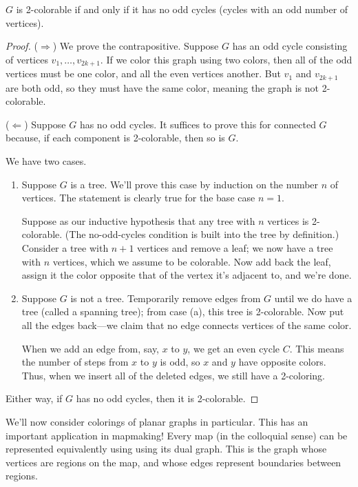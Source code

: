 \documentclass[../m055main.tex]{subfiles}
\begin{document}
\begin{theorem}
    $G$ is 2-colorable if and only if it has no odd cycles (cycles with an odd number of vertices).
\end{theorem}

\begin{proof}
    ($\Rightarrow$) We prove the contrapositive.
    Suppose $G$ has an odd cycle consisting of vertices $v_1, \ldots, v_{2k+1}$.
    If we color this graph using two colors, then all of the odd vertices must be one color, and all the even vertices another.
    But $v_1$ and $v_{2k+1}$ are both odd, so they must have the same color, meaning the graph is not 2-colorable.
    \smallskip

    ($\Leftarrow$) Suppose $G$ has no odd cycles.
    It suffices to prove this for connected $G$ because, if each component is 2-colorable, then so is $G$.

    We have two cases.
    \begin{enumerate}[label=(\alph*)]
        \item Suppose $G$ is a tree.
        We'll prove this case by induction on the number $n$ of vertices.
        The statement is clearly true for the base case $n=1$.

        Suppose as our inductive hypothesis that any tree with $n$ vertices is 2-colorable.
        (The no-odd-cycles condition is built into the tree by definition.)
        Consider a tree with $n+1$ vertices and remove a leaf; we now have a tree with $n$ vertices, which we assume to be colorable.
        Now add back the leaf, assign it the color opposite that of the vertex it's adjacent to, and we're done.

        \item Suppose $G$ is not a tree.
        Temporarily remove edges from $G$ until we do have a tree (called a spanning tree); from case (a), this tree is 2-colorable.
        Now put all the edges back---we claim that no edge connects vertices of the same color.

        When we add an edge from, say, $x$ to $y$, we get an even cycle $C$.
        This means the number of steps from $x$ to $y$ is odd, so $x$ and $y$ have opposite colors.
        Thus, when we insert all of the deleted edges, we still have a 2-coloring.
    \end{enumerate}
    Either way, if $G$ has no odd cycles, then it is 2-colorable.
\end{proof}

We'll now consider colorings of planar graphs in particular.
This has an important application in mapmaking!
Every map (in the colloquial sense) can be represented equivalently using using its dual graph.
This is the graph whose vertices are regions on the map, and whose edges represent boundaries between regions.
\end{document}
